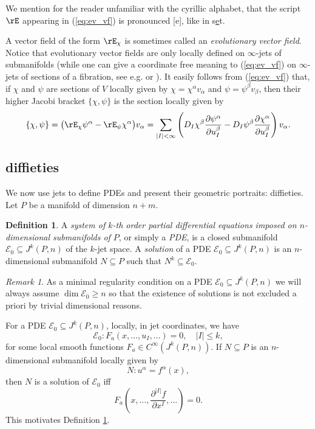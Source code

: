 \documentclass{conm-p-l}
\theoremstyle{definition}
\newtheorem{definition}[theorem]{Definition}
\theoremstyle{remark}
\newtheorem{remark}[theorem]{Remark}
\numberwithin{equation}{section}
\begin{document}
We mention for the reader unfamiliar with the cyrillic alphabet, that the script $\rE$ appearing in (\ref{eq:ev_vf}) is pronounced [e], like in s\underline{e}t.
  
A vector field of the form $\rE_\chi$ is sometimes called an \emph{evolutionary vector field}. Notice that evolutionary vector fields are only locally defined on $\infty$-jets of submanifolds (while one can give a coordinate free meaning to (\ref{eq:ev_vf}) on $\infty$-jets of sections of a fibration,  see e.g.{} \cite[Chapter 4, Section 2.4]{b...99} or \cite[Section 3.9]{kv98}  ). It easily follows from (\ref{eq:ev_vf}) that, if $\chi$ and $\psi$ are sections of $V$ locally given by $\chi = \chi^\alpha v_\alpha$ and $\psi = \psi^\beta v_\beta$, then their higher Jacobi bracket $\{ \chi, \psi\}$ is the section locally given by
\[
\{ \chi, \psi \} = \big(\rE_\chi \psi^\alpha - \rE_\psi \chi^\alpha\big) v_\alpha = \sum_{|I|< \infty}\left(D_I \chi^\beta \frac{\partial \psi^\alpha}{\partial u^\beta_I} - D_I \psi^\beta \frac{\partial \chi^\alpha}{\partial u^\beta_I}\right) v_\alpha.
\]

\subsection{diffieties} We now use jets to define PDEs and present their geometric portraits: diffieties. Let $P$ be a manifold of dimension $n + m$.

\begin{definition}\label{def:PDE}
A \emph{system of $k$-th order partial differential equations imposed on $n$-dimensional submanifolds of $P$}, or simply a \emph{PDE}, is a closed submanifold $\mathscr E_0 \subseteq J^k (P, n)$ of the $k$-jet space. A \emph{solution} of a PDE $\mathscr E_0 \subseteq J^k (P, n)$ is an $n$-dimensional submanifold $N \subseteq P$ such that $N^k \subseteq \mathscr E_0$.
\end{definition}

\begin{remark}
As a minimal regularity condition on a PDE $\mathscr E_0 \subseteq J^k (P, n)$ we will always assume $\dim \mathscr E_0 \geq n$ so that the existence of solutions is not excluded a priori by trivial dimensional reasons.
\end{remark}

For a PDE $\mathscr E_0 \subseteq J^k (P, n)$, locally, in jet coordinates, we have
\begin{equation}\label{eq:PDE}
\mathscr E_0 : F_a (x, \ldots, u_I, \ldots) = 0, \quad |I| \leq k,
\end{equation}
for some local smooth functions $F_a \in C^\infty (J^k (P, n))$. If $N \subseteq P$ is an $n$-dimensional submanifold locally given by
\[
N : u^\alpha = f^\alpha (x) ,
\]
then $N$ is a solution of $\mathscr E_0$ iff
\[
F_a \left(x, \ldots, \frac{\partial^{|I|}f}{\partial x^I}, \ldots\right) = 0 .
\]
This motivates Definition \ref{def:PDE}.
\end{document}
